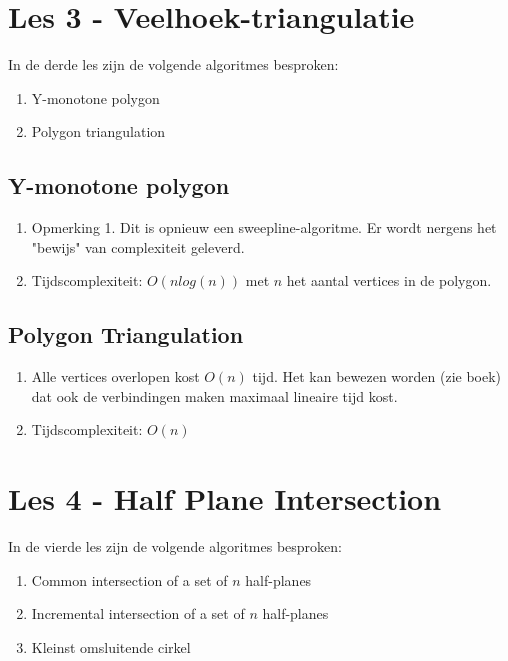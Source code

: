 \documentclass[12pt,a4paper]{article}
\begin{document}
	\section{Les 3 - Veelhoek-triangulatie}    
		In de derde les zijn de volgende algoritmes besproken:
		\begin{enumerate}
			\item Y-monotone polygon
			\item Polygon triangulation
		\end{enumerate}                
	
		\subsection{Y-monotone polygon}
			\begin{enumerate}
				\item Opmerking 1. Dit is opnieuw een sweepline-algoritme. Er wordt nergens het "bewijs" van complexiteit geleverd.
				\item Tijdscomplexiteit: $O(n log (n))$ met $n$ het aantal vertices in de polygon. 
			\end{enumerate}
		
		\subsection{Polygon Triangulation}
			\begin{enumerate}
				\item Alle vertices overlopen kost $O(n)$ tijd. Het kan bewezen worden (zie boek) dat ook de verbindingen maken maximaal lineaire tijd kost.
				\item Tijdscomplexiteit: $O(n)$
			\end{enumerate}
		
	\section{Les 4 - Half Plane Intersection}
		In de vierde les zijn de volgende algoritmes besproken:
		\begin{enumerate}
			\item Common intersection of a set of $n$ half-planes
			\item Incremental intersection of a set of $n$ half-planes
			\item Kleinst omsluitende cirkel
		\end{enumerate}    
	
\end{document}
